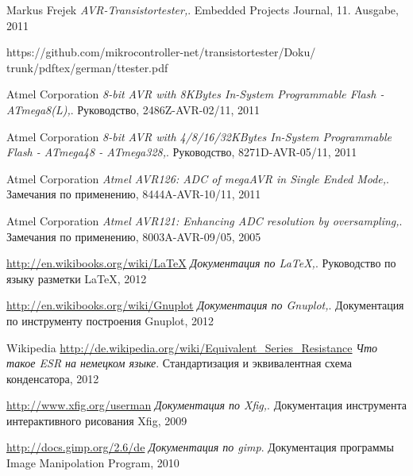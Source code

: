 \documentclass[12pt,a4paper,oneside,english]{report}
\DeclareRobustCommand{\_}{\ifmmode{\rule{1ex}{.4pt}}\else \textunderscore\hspace{0pt}\fi}
\begin{document}








 
 
 
 
 
 






\begin{thebibliography}{99}

Markus Frejek
\emph{AVR-Transistortester,}.
Embedded Projects Journal,
11. Ausgabe,
2011

https://github.com/mikrocontroller-net/transistortester/Doku/
trunk/pdftex/german/ttester.pdf

Atmel Corporation
\emph{8-bit AVR with 8KBytes In-System Programmable Flash - ATmega8(L),}.
Руководство,
2486Z-AVR-02/11,
2011

Atmel Corporation
\emph{8-bit AVR with 4/8/16/32KBytes In-System Programmable Flash - ATmega48 - ATmega328,}.
Руководство,
8271D-AVR-05/11,
2011

Atmel Corporation
\emph{Atmel AVR126: ADC of megaAVR in Single Ended Mode,}.
Замечания по применению,
8444A-AVR-10/11,
2011

Atmel Corporation
\emph{Atmel AVR121: Enhancing ADC resolution by oversampling,}.
Замечания по применению,
8003A-AVR-09/05,
2005

\url{http://en.wikibooks.org/wiki/LaTeX}
\emph{Документация по LaTeX,}.
Руководство по языку разметки LaTeX,
2012

\url{http://en.wikibooks.org/wiki/Gnuplot}
\emph{Документация по Gnuplot,}.
Документация по инструменту построения Gnuplot,
2012

Wikipedia
\url{http://de.wikipedia.org/wiki/Equivalent_Series_Resistance}
\emph{Что такое ESR на немецком языке}.
Стандартизация и эквивалентная схема конденсатора,
2012


\url{http://www.xfig.org/userman}
\emph{Документация по Xfig,}.
Документация инструмента интерактивного рисования Xfig,
2009

\url{http://docs.gimp.org/2.6/de}
\emph{Документация по gimp}.
Документация программы Image Manipolation Program,
2010


\end{thebibliography}
\end{document}
